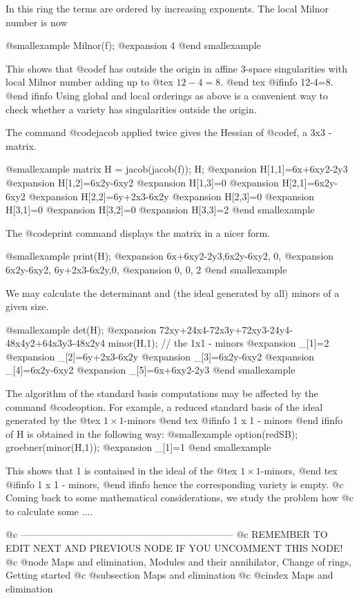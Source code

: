 In this ring the terms are ordered by increasing exponents. The local Milnor
number is now

@smallexample
Milnor(f);
@expansion{} 4
@end smallexample

This shows that @code{f} has outside the origin in affine 3-space
singularities with local Milnor number adding up to
@tex
$12-4=8$.
@end tex
@ifinfo
12-4=8.
@end ifinfo
Using global and local orderings as above is a convenient way to check
whether a variety has singularities outside the origin.

The command @code{jacob} applied twice gives the Hessian of @code{f}, a
3x3 - matrix.

@smallexample
matrix H = jacob(jacob(f));
H;
@expansion{} H[1,1]=6x+6xy2-2y3
@expansion{} H[1,2]=6x2y-6xy2
@expansion{} H[1,3]=0
@expansion{} H[2,1]=6x2y-6xy2
@expansion{} H[2,2]=6y+2x3-6x2y
@expansion{} H[2,3]=0
@expansion{} H[3,1]=0
@expansion{} H[3,2]=0
@expansion{} H[3,3]=2
@end smallexample

The @code{print} command displays the matrix in a nicer form.

@smallexample
print(H);
@expansion{} 6x+6xy2-2y3,6x2y-6xy2,  0,
@expansion{} 6x2y-6xy2,  6y+2x3-6x2y,0,
@expansion{} 0,          0,          2
@end smallexample

We may calculate the determinant and (the ideal generated by all) minors of
a given size.

@smallexample
det(H);
@expansion{} 72xy+24x4-72x3y+72xy3-24y4-48x4y2+64x3y3-48x2y4
minor(H,1);  // the 1x1 - minors
@expansion{} _[1]=2
@expansion{} _[2]=6y+2x3-6x2y
@expansion{} _[3]=6x2y-6xy2
@expansion{} _[4]=6x2y-6xy2
@expansion{} _[5]=6x+6xy2-2y3
@end smallexample

The algorithm of the standard basis computations may be
affected by the command @code{option}. For example, a reduced standard
basis of the ideal generated by the
@tex
$1 \times 1$-minors
@end tex
@ifinfo
1 x 1 - minors
@end ifinfo
 of H  is obtained in the following way:
@smallexample
option(redSB);
groebner(minor(H,1));
@expansion{} _[1]=1
@end smallexample

This shows that 1 is contained in the ideal of the
@tex
$1 \times 1$-minors,
@end tex
@ifinfo
1 x 1 - minors,
@end ifinfo
hence the corresponding variety is empty.
@c Coming back to some mathematical considerations, we study the problem how
@c to calculate some ....

@c ------------------------------------------------------------------
@c REMEMBER TO EDIT NEXT AND PREVIOUS NODE IF YOU UNCOMMENT THIS NODE!
@c @node Maps and elimination, Modules and their annihilator, Change of rings, Getting started
@c @subsection Maps and elimination
@c @cindex Maps and elimination

